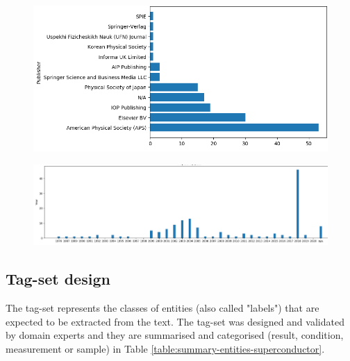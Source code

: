 \documentclass[a4paper,10pt]{article}
\begin{document}
\begin{figure}[h]
    \centering
    \includegraphics[width=\linewidth]{paper-by-publishers}
    \label{fig:distribution-by-publisher}
\end{figure}

\begin{figure}[h]
    \centering
    \includegraphics[width=\linewidth]{supermat-distribution-by-year}
    \label{fig:distribution-by-year}
\end{figure}


\subsection{Tag-set design}
The tag-set represents the classes of entities (also called "labels") that are expected to be extracted from the text. 
The tag-set was designed and validated by domain experts and they are summarised and categorised (result, condition, measurement or sample) in Table \ref{table:summary-entities-superconductor}.
\end{document}
